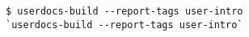 \begin{verbatim}
$ userdocs-build --report-tags user-intro
`userdocs-build --report-tags user-intro`
\end{verbatim}
